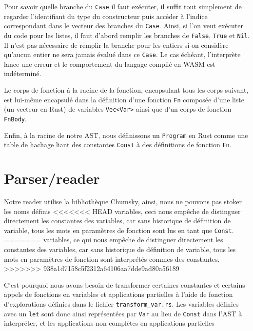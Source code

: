 \documentclass{rapportECL}
\begin{document}
\medskip

Pour savoir quelle branche du \verb|Case| il faut exécuter, il suffit tout simplement de regarder
l'identifiant du type du constructeur puis accéder à l'indice correspondant dans le vecteur des branches du \verb|Case|. 
Ainsi, si l'on veut exécuter du code pour les listes, il faut d'abord remplir les branches de \verb|False|, 
\verb|True| et \verb|Nil|. Il n'est pas nécessaire de remplir la branche pour les entiers si on considère qu'aucun entier
ne sera jamais évalué dans ce \verb|Case|. Le cas échéant, l'interprète lance une erreur et le comportement
du langage compilé en WASM est indéterminé.

\medskip

Le corps de fonction à la racine de la fonction, encapsulant tous les corps suivant, 
est lui-même encapsulé dans la définition d'une fonction \verb|Fn| composée d'une liste (un vecteur en Rust) de variables \verb|Vec<Var>| ainsi que
d'un corps de fonction \verb|FnBody|.

\medskip

Enfin, à la racine de notre AST, nous définissons un \verb|Program| en Rust comme une table de hachage liant des constantes \verb|Const| à 
des définitions de fonction \verb|Fn|.

\bigskip

\section{Parser/reader}

Notre reader utilise la bibliothèque Chumsky\cite{zesterer_chumsky_nodate}, ainsi, nous ne pouvons pas stoker les noms définis 
<<<<<<< HEAD
variables, ceci nous empêche de distinguer directement les constantes des variables, car sans historique de définition de variable, 
tous les mots en paramètres de fonction sont lus en tant que \verb|Const|.
=======
variables, ce qui nous empêche de distinguer directement les constantes des variables, car sans historique de définition de variable, 
tous les mots en paramètres de fonction sont interprétés commes des constantes.
>>>>>>> 938a1d7158c5f2312a64106aa7dde9ad80a56189

C'est pourquoi nous avons besoin de transformer certaines constantes et certains appels de fonctions en variables et applications partielles à l'aide de 
fonction d'explorations définies dans le fichier \verb|transform_var.rs|.
Les variables définies avec un \verb|let| sont donc ainsi représentées par \verb|Var| au lieu de \verb|Const| dans l'AST à interpréter,
et les applications non complètes en applications partielles
\end{document}
